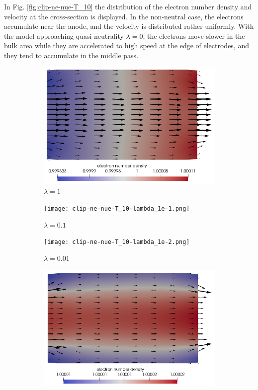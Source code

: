 \documentclass{report}
\begin{document}
In Fig. \ref{fig:clip-ne-nue-T_10} the distribution of the electron number density and velocity at the cross-section is displayed. In the non-neutral case, the electrons accumulate near the anode, and the velocity is distributed rather uniformly. With the model approaching quasi-neutrality $\lambda = 0$, the electrons move slower in the bulk area while they are accelerated to high speed at the edge of electrodes, and they tend to accumulate in the middle pass.
\begin{figure}
    \centering
    \begin{subfigure}[b]{0.4\textwidth}
        \centering
        \includegraphics[scale=0.4]{clip-ne-nue-T_10-lambda_1.png}
        \caption{$\lambda = 1$}
    \end{subfigure}
    \begin{subfigure}[b]{0.4\textwidth}
        \centering
        \texttt{[image: clip-ne-nue-T\_10-lambda\_1e-1.png]}
        \caption{$\lambda = 0.1$}
    \end{subfigure}
    \begin{subfigure}[b]{0.4\textwidth}
        \centering
        \texttt{[image: clip-ne-nue-T\_10-lambda\_1e-2.png]}
        \caption{$\lambda = 0.01$}
    \end{subfigure}
    \hspace{0.2cm}
    \begin{subfigure}[b]{0.4\textwidth}
        \centering
        \includegraphics[scale=0.38]{clip-ne-nue-T_10-lambda_0.png}

\end{subfigure}
\end{figure}
\end{document}
